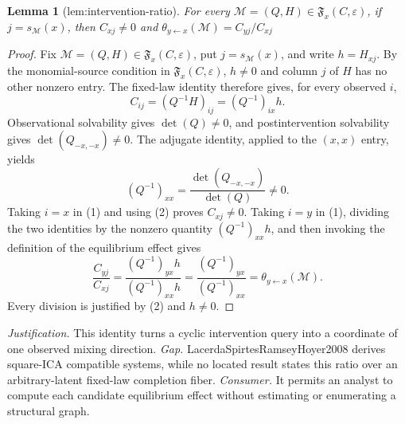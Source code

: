 \documentclass{article}
\newtheorem{lemma}{Lemma}
\begin{document}
\begin{lemma}[lem:intervention-ratio]\label{lem:intervention-ratio}
For every \(\mathcal M=(Q,H)\in\mathfrak F_x(C,\varepsilon)\), if \(j=s_{\mathcal M}(x)\), then \(C_{xj}\ne0\) and \(\theta_{y\leftarrow x}(\mathcal M)=C_{yj}/C_{xj}\)
\end{lemma}
\begin{proof}
Fix \(\mathcal M=(Q,H)\in\mathfrak F_x(C,\varepsilon)\), put \(j=s_{\mathcal M}(x)\), and write \(h=H_{xj}\). By the monomial-source condition in \(\mathfrak F_x(C,\varepsilon)\), \(h\ne0\) and column \(j\) of \(H\) has no other nonzero entry. The fixed-law identity therefore gives, for every observed \(i\),
\[
 C_{ij}=(Q^{-1}H)_{ij}=(Q^{-1})_{ix}h. \tag{1}
\]
Observational solvability gives \(\det(Q)\ne0\), and postintervention solvability gives \(\det(Q_{-x,-x})\ne0\). The adjugate identity, applied to the \((x,x)\) entry, yields
\[
 (Q^{-1})_{xx}=\frac{\det(Q_{-x,-x})}{\det(Q)}\ne0. \tag{2}
\]
Taking \(i=x\) in (1) and using (2) proves \(C_{xj}\ne0\). Taking \(i=y\) in (1), dividing the two identities by the nonzero quantity \((Q^{-1})_{xx}h\), and then invoking the definition of the equilibrium effect gives
\[
 \frac{C_{yj}}{C_{xj}}
 =\frac{(Q^{-1})_{yx}h}{(Q^{-1})_{xx}h}
 =\frac{(Q^{-1})_{yx}}{(Q^{-1})_{xx}}
 =\theta_{y\leftarrow x}(\mathcal M).
\]
Every division is justified by (2) and \(h\ne0\).
\end{proof}
\par\smallskip\noindent \textit{Justification.} This identity turns a cyclic intervention query into a coordinate of one observed mixing direction. \textit{Gap.} LacerdaSpirtesRamseyHoyer2008 derives square-ICA compatible systems, while no located result states this ratio over an arbitrary-latent fixed-law completion fiber. \textit{Consumer.} It permits an analyst to compute each candidate equilibrium effect without estimating or enumerating a structural graph.
\end{document}
